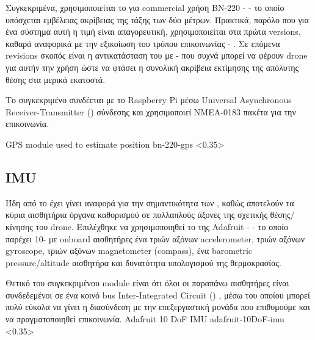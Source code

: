 Συγκεκριμένα, χρησιμοποιείται το  για commercial χρήση ΒΝ-220 \cite{bn-220-gps} -  - το οποίο υπόσχεται εμβέλειας ακρίβειας της τάξης των δύο μέτρων. Πρακτικά, παρόλο που για ένα  σύστημα αυτή η τιμή είναι απαγορευτική, χρησιμοποιείται στα πρώτα versions, καθαρά αναφορικά με την εξικοίωση του τρόπου επικοινωνίας  - . Σε επόμενα revisions σκοπός είναι η αντικατάσταση του με - που συχνά μπορεί να φέρουν drone για αυτήν την χρήση ώστε να φτάσει η συνολική ακρίβεια εκτίμησης της απόλυτης θέσης στα μερικά εκατοστά. 

Το συγκεκριμένο  συνδέεται με το Raspberry Pi μέσω Universal Asynchronous Receiver-Transmitter () \cite{uart-protocol} σύνδεσης και χρησιμοποιεί NMEA-0183 \cite{NMEA-0183-packets} πακέτα για την επικοινωνία. 

%
{GPS module used to estimate position}%
{bn-220-gps}%
<0.35>

\subsection{IMU}
Ήδη από το  έχει γίνει αναφορά για την σημαντικότητα των , καθώς αποτελούν τα κύρια αισθητήρια όργανα καθορισμού σε πολλαπλούς άξονες της σχετικής θέσης/κίνησης του drone. Επιλέχθηκε να χρησιμοποιηθεί το  \cite{adafruit-10dof-imu} της Adafruit -  - το οποίο παρέχει 10- με onboard αισθητήρες ένα τριών αξόνων accelerometer, τριών αξόνων gyroscope, τριών αξόνων magnetometer (compass), ένα barometric pressure/altitude αισθητήρα και δυνατότητα υπολογισμού της θερμοκρασίας.

Θετικό του συγκεκριμένου module είναι ότι όλοι οι παραπάνω αισθητήρες είναι συνδεδεμένοι σε ένα κοινό bus Inter-Integrated Circuit () \cite{I2C-protocol}, μέσω του οποίου μπορεί πολύ εύκολα να γίνει  η διασύνδεση με την επεξεργαστική μονάδα που επιθυμούμε και να πραγματοποιηθεί επικοινωνία.  
%
{Adafruit 10 DoF IMU}%
{adafruit-10DoF-imu}%
<0.35>

